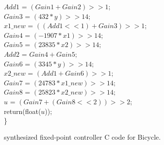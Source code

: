 \documentclass{amsart}
\numberwithin{equation}{section}
\begin{document}
\begin{figure}
\begin{tt}
\begin{scriptsize}
{\begin{tabbing}
\>    $Add1$ = $(Gain1 + Gain2) >> 1$; \\
\>    $Gain3$ = $(432 * y) >> 14$; \\
\>    $x1\_new$ = $((Add1 << 1) + Gain3) >> 1$; \\
\>    $Gain4$ = $(-1907 * x1) >> 14$; \\
\>    $Gain5$ = $(23835 * x2) >> 14$; \\
\>    $Add2$ = $Gain4 + Gain5$; \\
\>    $Gain6$ = $(3345 * y) >> 14$; \\
\>    $x2\_new$ = $(Add1 + Gain6) >> 1$; \\
\>    $Gain7$ = $(24783 * x1\_new) >> 14$; \\
\>    $Gain8$ = $(25823 * x2\_new) >> 14$; \\
\>    $u$ = $(Gain7 + (Gain8 << 2)) >> 2$; \\
\>    return(float($u$)); \\ 
\}
\end{tabbing}}
\end{scriptsize}
\end{tt}
\caption{synthesized fixed-point controller C code for Bicycle.} \label{fig:fxc}
\end{figure}
\end{document}
